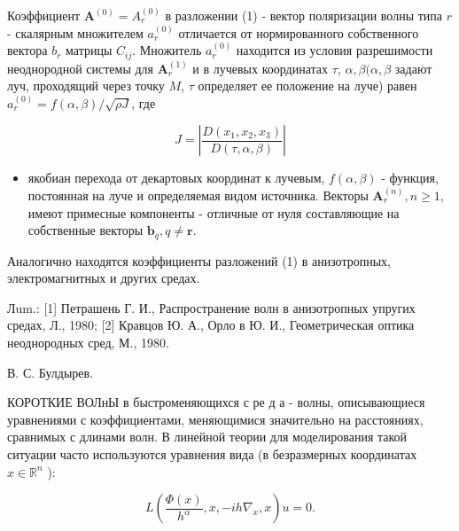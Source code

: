\documentclass[10pt]{article}
\begin{document}
Коэффициент $\boldsymbol{A}^{(0)}=A_{r}^{(0)}$ в разложении (1) - вектор поляризации волны типа $r$ - скалярным множителем $a_{r}^{(0)}$ отличается от нормированного собственного вектора $b_{r}$ матрицы $C_{i j}$. Множитель $a_{r}^{(0)}$ находится из условия разрешимости неоднородной системы для $\boldsymbol{A}_{r}^{(1)}$ и в лучевых координатах $\tau$, $\alpha, \beta(\alpha, \beta$ задают луч, проходящий через точку $M$, $\tau$ определяет ее положение на луче) равен $a_{r}^{(0)}=f(\alpha, \beta) / \sqrt{\rho J}$, где



\[

J=\left|\frac{D\left(x_{1}, x_{2}, x_{3}\right)}{D(\tau, \alpha, \beta)}\right|

\]



\begin{itemize}

  \item якобиан перехода от декартовых координат к лучевым, $f(\alpha, \beta)$ - функция, постоянная на луче и определяемая видом источника. Векторы $\boldsymbol{A}_{r}^{(n)}, n \geqslant 1$, имеют примесные компоненты - отличные от нуля составляющие на собственные векторы $\boldsymbol{b}_{q}, q \neq \boldsymbol{r}$.

\end{itemize}



Аналогично находятся коэффициенты разложений (1) в анизотропных, электромагнитных и других средах.



Лum.: [1] Петрашень Г. И., Распространение волн в анизотропных упругих средах, Л., 1980; [2] Кравцов Ю. А., Орло в Ю. И., Геометрическая оптика неоднородных сред, М., 1980.



В. С. Булдырев.



КОРОТКИЕ ВОЛнЫ в быстроменяющихся с ре д а - волны, описывающиеся уравнениями с коэффициентами, меняющимися значительно на расстояниях, сравнимых с длинами волн. В линейной теории для моделирования такой ситуации часто используются уравнения вида (в безразмерных координатах $x \in \mathbb{R}^{n}$ ):



\[

L\left(\frac{\Phi(x)}{h^{\alpha}}, x,-i h \nabla_{x}, x\right) u=0 .

\]
\end{document}
